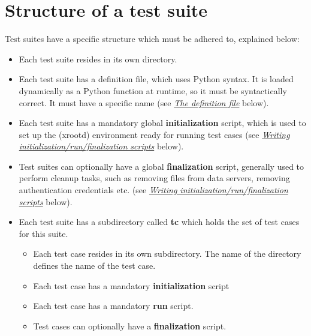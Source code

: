 \documentclass[letterpaper,10pt,english]{sphinxmanual}
\begin{document}
\section{Structure of a test suite}
\label{testsuites:structure-of-a-test-suite}
Test suites have a specific structure which must be adhered to,
explained below:
\begin{itemize}
\item {} 
Each test suite resides in its own directory.

\item {} 
Each test suite has a definition file, which uses Python syntax. It is loaded
dynamically as a Python function at runtime, so it must be syntactically
correct. It must have a specific name (see {\hyperref[testsuites:def-file]{\emph{The definition file}}} below).

\item {} 
Each test suite has a mandatory global \textbf{initialization} script, which is
used to set up the (xrootd) environment ready for running test cases (see
{\hyperref[testsuites:scripts]{\emph{Writing initialization/run/finalization scripts}}} below).

\item {} 
Test suites can optionally have a global \textbf{finalization} script, generally
used to perform cleanup tasks, such as removing files from data servers,
removing authentication credentials etc. (see {\hyperref[testsuites:scripts]{\emph{Writing initialization/run/finalization scripts}}} below).

\item {} 
Each test suite has a subdirectory called \textbf{tc} which holds the set of
test cases for this suite.
\begin{itemize}
\item {} 
Each test case resides in its own subdirectory. The name of the directory
defines the name of the test case.

\item {} 
Each test case has a mandatory \textbf{initialization} script

\item {} 
Each test case has a mandatory \textbf{run} script.

\item {} 
Test cases can optionally have a \textbf{finalization} script.

\end{itemize}

\end{itemize}
\end{document}
